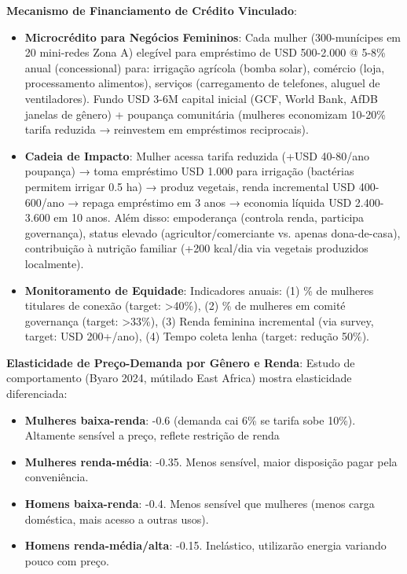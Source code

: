 \documentclass[12pt, a4paper]{article}
\begin{document}
\textbf{Mecanismo de Financiamento de Crédito Vinculado}:
\begin{itemize}
\item \textbf{Microcrédito para Negócios Femininos}: Cada mulher (300-munícipes em 20 mini-redes Zona A) elegível para empréstimo de USD 500-2.000 @ 5-8\% anual (concessional) para: irrigação agrícola (bomba solar), comércio (loja, processamento alimentos), serviços (carregamento de telefones, aluguel de ventiladores). Fundo USD 3-6M capital inicial (GCF, World Bank, AfDB janelas de gênero) + poupança comunitária (mulheres economizam 10-20\% tarifa reduzida → reinvestem em empréstimos reciprocais).

\item \textbf{Cadeia de Impacto}: Mulher acessa tarifa reduzida (+USD 40-80/ano poupança) → toma empréstimo USD 1.000 para irrigação (bactérias permitem irrigar 0.5 ha) → produz vegetais, renda incremental USD 400-600/ano → repaga empréstimo em 3 anos → economia líquida USD 2.400-3.600 em 10 anos. Além disso: empoderança (controla renda, participa governança), status elevado (agricultor/comerciante vs. apenas dona-de-casa), contribuição à nutrição familiar (+200 kcal/dia via vegetais produzidos localmente).

\item \textbf{Monitoramento de Equidade}: Indicadores anuais: (1) \% de mulheres titulares de conexão (target: >40\%), (2) \% de mulheres em comité governança (target: >33\%), (3) Renda feminina incremental (via survey, target: USD 200+/ano), (4) Tempo coleta lenha (target: redução 50\%).
\end{itemize}

\textbf{Elasticidade de Preço-Demanda por Gênero e Renda}: Estudo de comportamento (Byaro 2024, mútilado East Africa) mostra elasticidade diferenciada:
\begin{itemize}
\item \textbf{Mulheres baixa-renda}: -0.6 (demanda cai 6\% se tarifa sobe 10\%). Altamente sensível a preço, reflete restrição de renda
\item \textbf{Mulheres renda-média}: -0.35. Menos sensível, maior disposição pagar pela conveniência.
\item \textbf{Homens baixa-renda}: -0.4. Menos sensível que mulheres (menos carga doméstica, mais acesso a outras usos).
\item \textbf{Homens renda-média/alta}: -0.15. Inelástico, utilizarão energia variando pouco com preço.
\end{itemize}
\end{document}
